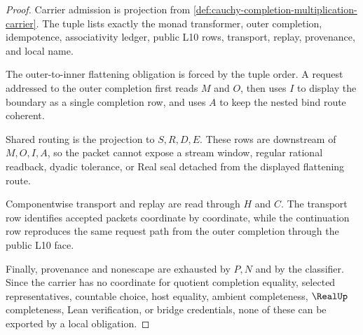 \begin{proof}
Carrier admission is projection from \autoref{def:cauchy-completion-multiplication-carrier}. The tuple lists exactly the monad transformer, outer completion, idempotence, associativity ledger, public L10 rows, transport, replay, provenance, and local name.

The outer-to-inner flattening obligation is forced by the tuple order. A request addressed to the outer completion first reads $M$ and $O$, then uses $I$ to display the boundary as a single completion row, and uses $A$ to keep the nested bind route coherent.

Shared routing is the projection to $S,R,D,E$. These rows are downstream of $M,O,I,A$, so the packet cannot expose a stream window, regular rational readback, dyadic tolerance, or Real seal detached from the displayed flattening route.

Componentwise transport and replay are read through $H$ and $C$. The transport row identifies accepted packets coordinate by coordinate, while the continuation row reproduces the same request path from the outer completion through the public L10 face.

Finally, provenance and nonescape are exhausted by $P,N$ and by the classifier. Since the carrier has no coordinate for quotient completion equality, selected representatives, countable choice, host equality, ambient completeness, $\RealUp$ completeness, Lean verification, or bridge credentials, none of these can be exported by a local obligation.
\end{proof}

